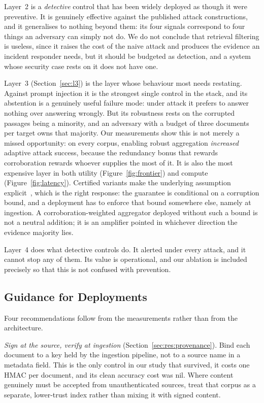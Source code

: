 \documentclass[information,article,submit,moreauthors]{Definitions/mdpi}
\begin{document}
Layer~2 is a \emph{detective} control that has been widely deployed as though it were
preventive. It is genuinely effective against the published attack constructions, and it
generalises to nothing beyond them: its four signals correspond to four things an adversary can
simply not do. We do not conclude that retrieval filtering is useless, since it raises the
cost of the naive attack and produces the evidence an incident responder needs, but it should
be
budgeted as detection, and a system whose security case rests on it does not have one.

Layer~3 (Section~\ref{sec:l3}) is the layer whose behaviour most needs restating. Against prompt injection it is the
strongest single control in the stack, and its abstention is a genuinely useful failure mode:
under attack it prefers to answer nothing over answering wrongly. But its robustness rests on
the corrupted passages being a minority, and an adversary with a budget of three documents per
target owns that majority. Our measurements show this is not merely a missed opportunity: on
every corpus, enabling robust aggregation \emph{increased} adaptive attack success, because the
redundancy bonus that rewards corroboration rewards whoever supplies the most of it. It is also
the most expensive layer in both utility (Figure~\ref{fig:frontier}) and compute
(Figure~\ref{fig:latency}). Certified variants make the underlying assumption
explicit~\citep{xiang2024robustrag}, which is the right response: the guarantee is conditional
on a corruption bound, and a deployment has to enforce that bound somewhere else, namely at
ingestion.
A corroboration-weighted aggregator deployed without such a bound is not a neutral addition; it
is an amplifier pointed in whichever direction the evidence majority lies.

Layer~4 does what detective controls do. It alerted under every attack, and it cannot stop any
of them. Its value is operational, and our ablation is included precisely so that this is not
confused with prevention.

\subsection{Guidance for Deployments}

Four recommendations follow from the measurements rather than from the architecture.

\emph{Sign at the source, verify at ingestion} (Section~\ref{sec:res:provenance}). Bind each document to a key held by the
ingestion pipeline, not to a source name in a metadata field. This is the only control in our
study that survived, it costs one HMAC per document, and its clean accuracy cost was nil.
Where content genuinely must be accepted from unauthenticated sources, treat that corpus as a
separate, lower-trust index rather than mixing it with signed content.
\end{document}
